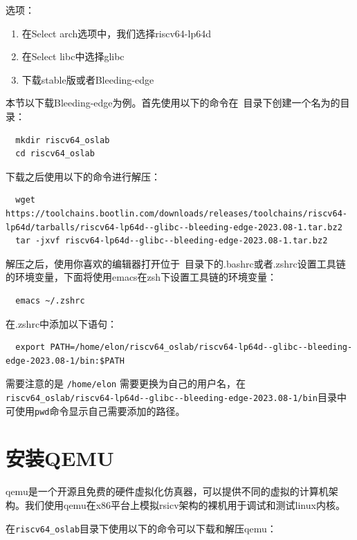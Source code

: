 \documentclass[lang=cn,10pt]{elegantbook}
\begin{document}
选项：
\begin{enumerate}

\item 在Select arch选项中，我们选择riscv64-lp64d
\item 在Select libc中选择glibc
\item 下载stable版或者Bleeding-edge
  
\end{enumerate}

本节以下载Bleeding-edge为例。首先使用以下的命令在~目录下创建一个名为的目录：

\begin{lstlisting}
  mkdir riscv64_oslab
  cd riscv64_oslab
\end{lstlisting}

下载之后使用以下的命令进行解压：

\begin{lstlisting}
  wget https://toolchains.bootlin.com/downloads/releases/toolchains/riscv64-lp64d/tarballs/riscv64-lp64d--glibc--bleeding-edge-2023.08-1.tar.bz2
  tar -jxvf riscv64-lp64d--glibc--bleeding-edge-2023.08-1.tar.bz2  
\end{lstlisting}

解压之后，使用你喜欢的编辑器打开位于~目录下的.bashrc或者.zshrc设置工具链的环境变量，下面将使用emacs在zsh下设置工具链的环境变量：

\begin{lstlisting}
  emacs ~/.zshrc
\end{lstlisting}

在.zshrc中添加以下语句：

\begin{lstlisting}
  export PATH=/home/elon/riscv64_oslab/riscv64-lp64d--glibc--bleeding-edge-2023.08-1/bin:$PATH
\end{lstlisting}

需要注意的是 \lstinline{/home/elon} 需要更换为自己的用户名，在\lstinline{riscv64_oslab/riscv64-lp64d--glibc--bleeding-edge-2023.08-1/bin}目录中可使用\lstinline{pwd}命令显示自己需要添加的路径。

\section{安装QEMU}
qemu是一个开源且免费的硬件虚拟化仿真器，可以提供不同的虚拟的计算机架构。我们使用qemu在x86平台上模拟rsicv架构的裸机用于调试和测试linux内核。

在\lstinline{riscv64_oslab}目录下使用以下的命令可以下载和解压qemu：
\end{document}
